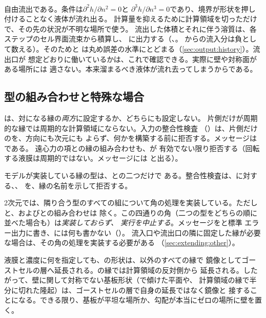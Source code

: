 \paragraph{} 自由流出である。条件は$\partial^2 h/\partial n^2 = 0$と
$\partial^3 h/\partial n^3 = 0$であり、境界が形状を押し付けることなく液体が流れ出る。
計算量を抑えるために計算領域を切っただけで、その先の状況が不明な場所で使う。
流出した体積とそれに伴う溶質は、各ステップのセル界面流束から積算し、
に出力する（、。
からの流入分は負として数える）。そのためと
は丸め誤差の水準にとどまる（\cref{sec:output:history}）。流出口が
想定どおりに働いているかは、これで確認できる。実際に壁や対称面がある場所には
適さない。本来溜まるべき液体が流れ去ってしまうからである。

\subsection{型の組み合わせと特殊な場合}

は、対になる縁の\emph{両方}に設定するか、どちらにも設定しない。
片側だけが周期的な縁では周期的な計算領域にならない。入力の整合性検査
（）は、片側だけのを、方向にも次元にも
よらず、何かを構築する前に拒否する。メッセージは
である。
遠心力の項との縁の組み合わせも、が
有効でない限り拒否する（回転する液膜は周期的ではない。メッセージには
と出る）。

モデルが実装している縁の型は、との二つだけで
ある。整合性検査は、に対する、、
を、縁の名前を示して拒否する。

2次元では、隣り合う型のすべての組について角の処理を実装している。ただし
と、およびとの組み合わせは
除く。この四通りの角（二つの型をどちらの順に並べた場合も）は\emph{実装しておらず、
実行を中止する}。メッセージをと標準
エラー出力に書き、には何も書かない（）。
流入口や流出口の隣に固定した縁が必要な場合は、その角の処理を実装する必要がある
（\cref{sec:extending:other}）。

\begin{warn}[基板は壁で鏡映される]
  液膜と濃度に何を指定しても、の形状は、以外のすべての縁で
  鏡像としてゴーストセルの層へ延長される。の縁では計算領域の反対側から
  延長される。したがって、壁に関して対称でない基板形状（で傾けた平面や、
  計算領域の縁で半分に切れた隆起）は、ゴーストセルの層で自身の延長ではなく鏡像と
  接することになる。できる限り、基板が平坦な場所か、勾配が本当にゼロの場所に壁を置く。
\end{warn}

